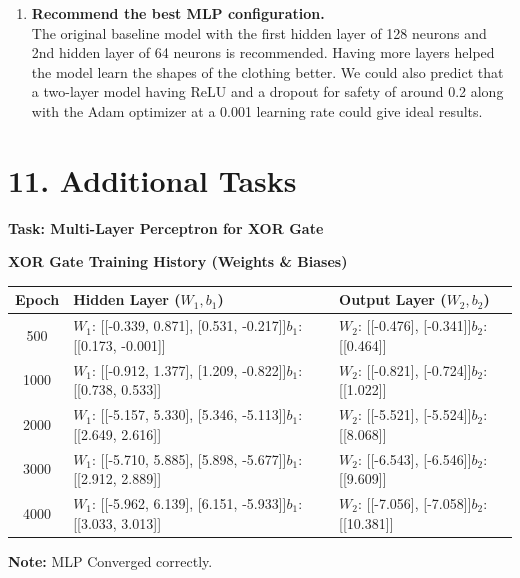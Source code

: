 \documentclass[11pt]{article}
\begin{document}
\begin{enumerate}
\item \vspace{1mm}\textbf{Recommend the best MLP configuration.}\vspace{1mm}\\
The original baseline model with the first hidden layer of 128 neurons and 2nd hidden layer of 64 neurons is recommended. Having more layers helped the model learn the shapes of the clothing better. We could also predict that a two-layer model having ReLU and a dropout for safety of around 0.2 along with the Adam optimizer at a 0.001 learning rate could give ideal results.

\end{enumerate}

\section*{11. Additional Tasks}

\textbf{Task: Multi-Layer Perceptron for XOR Gate}

\vspace{4mm}
\noindent\textbf{XOR Gate Training History (Weights \& Biases)}

\vspace{2mm}
\begin{center}
\begin{tabular}{|c|p{7cm}|p{6.5cm}|}
\hline
\textbf{Epoch} & \textbf{Hidden Layer ($W_1, b_1$)} & \textbf{Output Layer ($W_2, b_2$)} \\
\hline
500 & $W_1$: [[-0.339, 0.871], [0.531, -0.217]]\newline $b_1$: [[0.173, -0.001]] & $W_2$: [[-0.476], [-0.341]]\newline $b_2$: [[0.464]] \\
\hline
1000 & $W_1$: [[-0.912, 1.377], [1.209, -0.822]]\newline $b_1$: [[0.738, 0.533]] & $W_2$: [[-0.821], [-0.724]]\newline $b_2$: [[1.022]] \\
\hline
2000 & $W_1$: [[-5.157, 5.330], [5.346, -5.113]]\newline $b_1$: [[2.649, 2.616]] & $W_2$: [[-5.521], [-5.524]]\newline $b_2$: [[8.068]] \\
\hline
3000 & $W_1$: [[-5.710, 5.885], [5.898, -5.677]]\newline $b_1$: [[2.912, 2.889]] & $W_2$: [[-6.543], [-6.546]]\newline $b_2$: [[9.609]] \\
\hline
4000 & $W_1$: [[-5.962, 6.139], [6.151, -5.933]]\newline $b_1$: [[3.033, 3.013]] & $W_2$: [[-7.056], [-7.058]]\newline $b_2$: [[10.381]] \\
\hline
\end{tabular}
\end{center}
\textbf{Note:} MLP Converged correctly.
\end{document}
